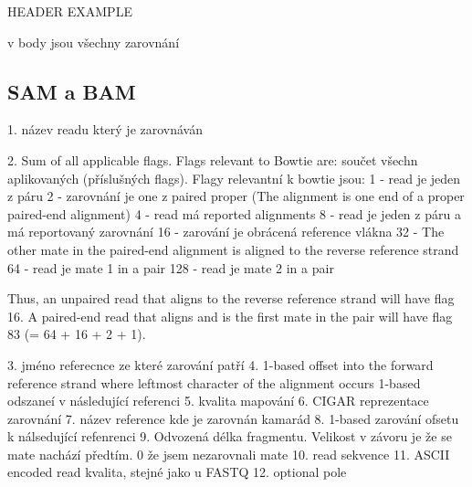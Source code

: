 \documentclass[czech,DP]{thesiskiv}
\numberwithin{equation}{section}
\begin{document}
		HEADER EXAMPLE

		
v body jsou všechny zarovnání 

\subsection{SAM a BAM}
1. název readu který je zarovnáván

2. Sum of all applicable flags. Flags relevant to Bowtie are:
součet všechn aplikovaných (příslušných flags). Flagy relevantní k bowtie jsou: 
1 - read je jeden z páru
2 - zarovnání je one z paired proper (The alignment is one end of a proper paired-end alignment)
4 - read má reported alignments
8 - read je jeden z páru a má reportovaný zarovnání
16 - zarování je obrácená reference vlákna
32 - The other mate in the paired-end alignment is aligned to the reverse reference strand
64 - read je mate 1 in a pair
128 - read je mate 2 in a pair

Thus, an unpaired read that aligns to the reverse reference strand will have flag 16. A paired-end read that aligns and is the first mate in the pair will have flag 83 (= 64 + 16 + 2 + 1).

3. jméno referecnce ze které zarování patří
4. 1-based offset into the forward reference strand where leftmost character of the alignment occurs 1-based odszaneí v následující referenci 
5. kvalita mapování
6. CIGAR reprezentace zarovnání
7. název reference kde je zarovnán kamarád 
8. 1-based zarování ofsetu k nálsedující refenrenci 
9. Odvozená délka fragmentu. Velikost v závoru je že se mate nachází předtím. 0 že jsem nezarovnali mate
10. read sekvence
11. ASCII encoded read kvalita, stejné jako u FASTQ
12. optional pole
\end{document}
